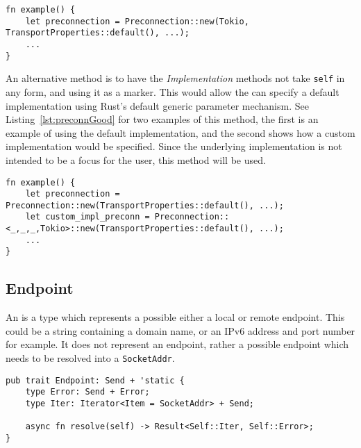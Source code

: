 \begin{lstlisting}[float=h, label=lst:preconnBad, caption={An example of how to construct a
Preconnection if the Implementation trait is to be passed when the Preconnection is constructed}]
fn example() {
    let preconnection = Preconnection::new(Tokio, TransportProperties::default(), ...);
    ...
}
\end{lstlisting}

An alternative method is to have the \emph{Implementation} methods not take \texttt{self} in any form, and using it as a
marker.
This would allow the \preconnection{} can specify a default implementation using Rust's default generic parameter
mechanism.
See Listing~\ref{lst:preconnGood} for two examples of this method, the first \preconnection{} is an example of using
the default implementation, and the second \preconnection{} shows how a custom implementation would be specified.
Since the underlying implementation is not intended to be a focus for the user, this method will be used.

\begin{lstlisting}[float=h, label=lst:preconnGood, caption={An example of how to construct a
Preconnection if the Implementation trait is used as a marker.}]
fn example() {
    let preconnection = Preconnection::new(TransportProperties::default(), ...);
    let custom_impl_preconn = Preconnection::<_,_,_,Tokio>::new(TransportProperties::default(), ...);
    ...
}
\end{lstlisting}

\subsection{Endpoint}\label{subsec:endpoint}
An \Endpoint{} is a type which represents a possible either a local or remote endpoint.
This could be a string containing a domain name, or an IPv6 address and port number for example.
It does not represent an endpoint, rather a possible endpoint which needs to be resolved into a \texttt{SocketAddr}.

\begin{lstlisting}[float=h, label=lst:endpoint, caption={The Endpoint Trait with the resolve method returning an
        Iterator.}]
pub trait Endpoint: Send + 'static {
    type Error: Send + Error;
    type Iter: Iterator<Item = SocketAddr> + Send;

    async fn resolve(self) -> Result<Self::Iter, Self::Error>;
}
\end{lstlisting}

